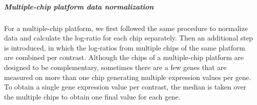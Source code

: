 \subparagraph{Multiple-chip platform data 
normalization}\label{sec:command-multichip-norm}
For a multiple-chip platform, we first followed the same procedure to
normalize data and calculate the log-ratio for each chip separately.
%
Then an additional step is introduced, in which the log-ratios from multiple
chips of the same platform are combined per contrast.
%
Although the chips of a multiple-chip platform are designed to be
complementary, sometimes there are a few genes that are measured on more than
one chip generating multiple expression values per gene.
%
To obtain a single gene expression value per contrast, the median is taken
over the multiple chips to obtain one final value for each gene.


%
%
%



